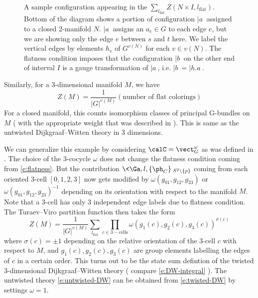 \begin{figure}[ht]
\caption{A sample configuration appearing in the $\sum_{l_{\mathrm{flat}}} Z(N \times I , l_{\mathrm{flat}} )$. 
	Bottom of the diagram shows a portion of configuration $| a \>$ assigned to a closed 2-manifold $N$. $|a\>$ 
	assigns an $a_e \in G$ to each edge $e$, but we are showing only the edge $e$ between $s$ and $t$ here. 
	We label the vertical edges by elements $h_v$ of $G^{v(N)}$ for each $v \in v(N)$. 
	The flatness condition imposes that the configuration $|b\>$ on the other end of interval $I$ is a 
	gauge transformation of $|a\>$, i.e. $|b\>=|h.a\>$.}
\label{f:flat-guage-configuration}
\end{figure}

Similarly, for a 3-dimensional manifold $M$, we have
\begin{equation}\label{e:untwisted-DW}
	Z(M) = \frac{1}{|G|^{v(M)}} (\text{number of flat colorings})
\end{equation}
For a closed manifold, this counts isomorphism classes of principal G-bundles on $M$ ( with the appropriate
 weight that was described in  ). This is same as the untwisted Dijkgraaf--Witten theory
  in 3 dimensions.


We can generalize this example by considering $\calC = \vect_G^\omega$ as was defined in . 
The choice of the 3-cocycle $\omega$ does not change the flatness condition coming from \eqref{e:flatness}. 
But the contribution $\<\Ga,l,\{ \ph_C\}\>_{S^2\setminus\{p\}}$ 
 coming from each oriented 3-cell $[0,1,2,3]$ now gets modified by $\omega(g_{01},g_{12},g_{23})$ or 
 $\omega(g_{01},g_{12},g_{23})^{-1}$ depending on its orientation with respect to the manifold $M$. Note that a 3-cell 
 has only 3 independent edge labels due to flatness condition. The Turaev--Viro partition function then takes the form
\begin{equation}\label{e:twisted-DW}
Z(M) = \frac{1}{|G|^{v(M)}} \sum_{l_\mathrm{flat}} \prod_{c \in \mathrm{3-cells}} \omega(g_1(c),g_2(c),g_3(c))^{\sigma(c)}
\end{equation}
where $\sigma(c) = \pm 1 $ depending on the relative orientation of the 3-cell $c$ with respect to $M$, and 
$g_1(c),g_2(c),g_3(c)$ are group elements labelling the edges of $c$ in a certain order. This turns out to be 
the state sum defintion of the twisted 3-dimensional Dijkgraaf--Witten theory ( compare \eqref{e:DW-integral} ). The
 untwisted theory \eqref{e:untwisted-DW} can be obtained from \eqref{e:twisted-DW} by settings $\omega=1$.


